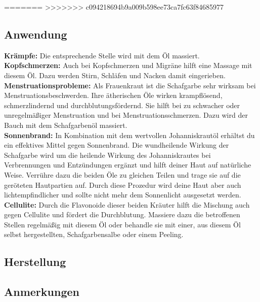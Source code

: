 =======
    
>>>>>>> c094218694b9a009b598ee73ca7fc63f84685977

\subsection{Anwendung}

\textbf{Krämpfe:} Die entsprechende Stelle wird mit dem Öl massiert.\\ 

\textbf{Kopfschmerzen:} Auch bei Kopfschmerzen und Migräne hilft eine Massage mit diesem Öl. Dazu werden Stirn, Schläfen und Nacken damit eingerieben. \\

\textbf{Menstruationsprobleme:} Als Frauenkraut ist die Schafgarbe sehr wirksam bei Menstruationsbeschwerden. Ihre ätherischen Öle wirken krampflösend, schmerzlindernd und durchblutungsfördernd. Sie hilft bei zu schwacher oder unregelmäßiger Menstruation und bei Menstruationsschmerzen. Dazu wird der Bauch mit dem Schafgarbenöl massiert.\\ 

\textbf{Sonnenbrand:} In Kombination mit dem wertvollen Johanniskrautöl erhältst du ein effektives Mittel gegen Sonnenbrand. Die wundheilende Wirkung der Schafgarbe wird um die heilende Wirkung des Johanniskrautes bei Verbrennungen und Entzündungen ergänzt und hilft deiner Haut auf natürliche Weise. Verrühre dazu die beiden Öle zu gleichen Teilen und trage sie auf die geröteten Hautpartien auf. Durch diese Prozedur wird deine Haut aber auch lichtempfindlicher und sollte nicht mehr dem Sonnenlicht ausgesetzt werden.\\ 

\textbf{Cellulite:} Durch die Flavonoide dieser beiden Kräuter hilft die Mischung auch gegen Cellulite und fördert die Durchblutung. Massiere dazu die betroffenen Stellen regelmäßig mit diesem Öl oder behandle sie mit einer, aus diesem Öl selbst hergestellten, Schafgarbensalbe oder einem Peeling. \\


\subsection{Herstellung}


\subsection{Anmerkungen}



